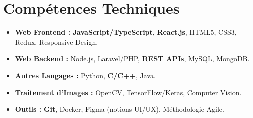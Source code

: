 \documentclass[a4paper,11pt]{article}
\begin{document}
\section{Compétences Techniques}
\begin{itemize}[leftmargin=*, nosep]
    \item \small{\textbf{Web Frontend :} \textbf{JavaScript/TypeScript}, \textbf{React.js}, HTML5, CSS3, Redux, Responsive Design.}
    \item \small{\textbf{Web Backend :} Node.js, Laravel/PHP, \textbf{REST APIs}, MySQL, MongoDB.}
    \item \small{\textbf{Autres Langages :} Python, \textbf{C/C++}, Java.}
    \item \small{\textbf{Traitement d'Images :} OpenCV, TensorFlow/Keras, Computer Vision.}
    \item \small{\textbf{Outils :} \textbf{Git}, Docker, Figma (notions UI/UX), Méthodologie Agile.}
\end{itemize}

\end{document}
